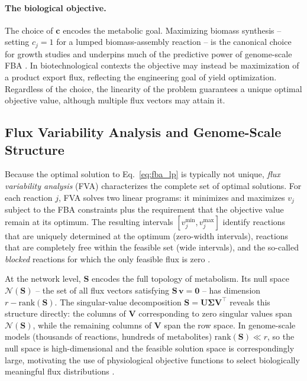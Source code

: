 \paragraph{The biological objective.}
The choice of $\mathbf{c}$ encodes the metabolic goal.  Maximizing biomass
synthesis -- setting $c_{j} = 1$ for a lumped biomass-assembly reaction -- is
the canonical choice for growth studies and underpins much of the predictive
power of genome-scale FBA \cite{Orth2010}.  In biotechnological contexts the
objective may instead be maximization of a product export flux, reflecting the
engineering goal of yield optimization.  Regardless of the choice, the linearity
of the problem guarantees a unique optimal objective value, although multiple
flux vectors may attain it.

\subsection{Flux Variability Analysis and Genome-Scale Structure}

Because the optimal solution to Eq.~\eqref{eq:fba_lp} is typically not unique,
\emph{flux variability analysis} (FVA) characterizes the complete set of optimal
solutions.  For each reaction $j$, FVA solves two linear programs: it minimizes
and maximizes $v_j$ subject to the FBA constraints plus the requirement that the
objective value remain at its optimum.  The resulting intervals $[v_j^{\min},
v_j^{\max}]$ identify reactions that are uniquely determined at the optimum
(zero-width intervals), reactions that are completely free within the feasible
set (wide intervals), and the so-called \emph{blocked} reactions for which the
only feasible flux is zero \cite{Heirendt2019}.

At the network level, $\mathbf{S}$ encodes the full topology of metabolism.
Its null space $\mathcal{N}(\mathbf{S})$ -- the set of all flux vectors
satisfying $\mathbf{S}\,\mathbf{v} = \mathbf{0}$ -- has dimension
$r - \mathrm{rank}(\mathbf{S})$.  The singular-value decomposition
$\mathbf{S} = \mathbf{U}\boldsymbol{\Sigma}\mathbf{V}^{\!\top}$ reveals this
structure directly: the columns of $\mathbf{V}$ corresponding to zero singular
values span $\mathcal{N}(\mathbf{S})$, while the remaining columns of
$\mathbf{V}$ span the row space.  In genome-scale models (thousands of
reactions, hundreds of metabolites) $\mathrm{rank}(\mathbf{S}) \ll r$, so the
null space is high-dimensional and the feasible solution space is correspondingly
large, motivating the use of physiological objective functions to select
biologically meaningful flux distributions \cite{Bordbar2014,Thiele2013}.

